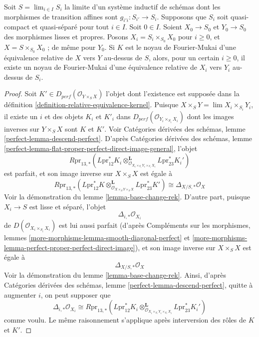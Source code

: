 \begin{lemma}
\label{lemma-descend-rek}
Soit $S = \lim_{i \in I} S_i$ la limite d'un système inductif de schémas
dont les morphismes de transition affines sont $g_{i'i} : S_{i'} \to S_i$.
Supposons que $S_i$ soit quasi-compact et quasi-séparé pour tout $i \in I$.
Soit $0 \in I$. Soient $X_0 \to S_0$ et $Y_0 \to S_0$ des morphismes lisses et propres.
Posons $X_i = S_i \times_{S_0} X_0$ pour $i \geq 0$,
et $X = S \times_{S_0} X_0$ ; de même pour $Y_0$. Si $K$ est le
noyau de Fourier-Mukai d'une équivalence relative de $X$ vers $Y$ au-dessus de $S$,
alors, pour un certain $i \geq 0$, il existe un
noyau de Fourier-Mukai d'une équivalence relative de $X_i$ vers $Y_i$ au-dessus de $S_i$.
\end{lemma}

\begin{proof}
Soit $K' \in D_{perf}(\mathcal{O}_{Y \times_S X})$ l'objet dont l'existence est
supposée dans la définition \ref{definition-relative-equivalence-kernel}.
Puisque $X \times_S Y = \lim X_i \times_{S_i} Y_i$, il existe un
$i$ et des objets $K_i$ et $K'_i$ dans
$D_{perf}(\mathcal{O}_{Y_i \times_{S_i} X_i})$
dont les images inverses sur $Y \times_S X$ sont $K$ et $K'$.
Voir Catégories dérivées des schémas, lemme \ref{perfect-lemma-descend-perfect}.
D'après Catégories dérivées des schémas, lemme
\ref{perfect-lemma-flat-proper-perfect-direct-image-general},
l'objet
$$
R\text{pr}_{13, *}(L\text{pr}_{12}^*K_i
\otimes_{\mathcal{O}_{X_i \times_{S_i} Y_i \times_{S_i} X_i}}^\mathbf{L}
L\text{pr}_{23}^*K_i')
$$
est parfait, et son image inverse sur $X \times_S X$ est égale à
$$
R\text{pr}_{13, *}(L\text{pr}_{12}^*K
\otimes_{\mathcal{O}_{X \times_S Y \times_S X}}^\mathbf{L}
L\text{pr}_{23}^*K') \cong \Delta_{X/S, *}\mathcal{O}_X
$$
Voir la démonstration du lemme \ref{lemma-base-change-rek}.
D'autre part, puisque $X_i \to S$ est lisse et séparé,
l'objet
$$
\Delta_{i, *}\mathcal{O}_{X_i}
$$
de $D(\mathcal{O}_{X_i \times_{S_i} X_i})$ est lui aussi parfait
(d'après Compléments sur les morphismes, lemmes
\ref{more-morphisms-lemma-smooth-diagonal-perfect} et
\ref{more-morphisms-lemma-perfect-proper-perfect-direct-image}), et
son image inverse sur $X \times_S X$ est égale à
$$
\Delta_{X/S, *}\mathcal{O}_X
$$
Voir la démonstration du lemme \ref{lemma-base-change-rek}. Ainsi, d'après
Catégories dérivées des schémas, lemme \ref{perfect-lemma-descend-perfect},
quitte à augmenter $i$, on peut supposer que
$$
\Delta_{i, *}\mathcal{O}_{X_i} \cong
R\text{pr}_{13, *}(L\text{pr}_{12}^*K_i
\otimes_{\mathcal{O}_{X_i \times_{S_i} Y_i \times_{S_i} X_i}}^\mathbf{L}
L\text{pr}_{23}^*K_i')
$$
comme voulu. Le même raisonnement s'applique après interversion des rôles de $K$ et $K'$.
\end{proof}








